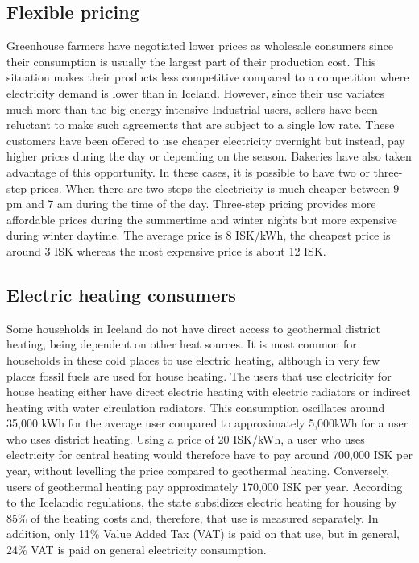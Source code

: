 \documentclass[svn, final]{rureport}
\begin{document}
\subsection{Flexible pricing}

Greenhouse farmers have negotiated lower prices as wholesale consumers since their consumption is usually the largest part of their production cost. This situation makes their products less competitive compared to a competition where electricity demand is lower than in Iceland. However, since their use variates much more than the big energy-intensive Industrial users, sellers have been reluctant to make such agreements that are subject to a single low rate.   
These customers have been offered to use cheaper electricity overnight but instead, pay higher prices during the day or depending on the season. Bakeries have also taken advantage of this opportunity. In these cases, it is possible to have two or three-step prices. When there are two steps the electricity is much cheaper between 9 pm and 7 am during the time of the day.  Three-step pricing provides more affordable prices during the summertime and winter nights but more expensive during winter daytime. The average price is 8 ISK/kWh, the cheapest price is around 3 ISK whereas the most expensive price is about 12 ISK.

\subsection{Electric heating consumers}

Some households in Iceland do not have direct access to geothermal district heating, being dependent on other heat sources. It is most common for households in these cold places to use electric heating, although in very few places fossil fuels are used for house heating. The users that use electricity for house heating either have direct electric heating with electric radiators or indirect heating with water circulation radiators. This consumption oscillates around 35,000 kWh for the average user compared to approximately 5,000kWh for a user who uses district heating. Using a price of 20 ISK/kWh, a user who uses electricity for central heating would therefore have to pay around 700,000 ISK per year, without levelling the price compared to geothermal heating. Conversely, users of geothermal heating pay approximately 170,000 ISK per year. According to the Icelandic regulations, the state subsidizes electric heating for housing by 85\% of the heating costs and, therefore, that use is measured separately. In addition, only 11\% Value Added Tax (VAT) is paid on that use, but in general, 24\% VAT is paid on general electricity consumption. 
\end{document}
